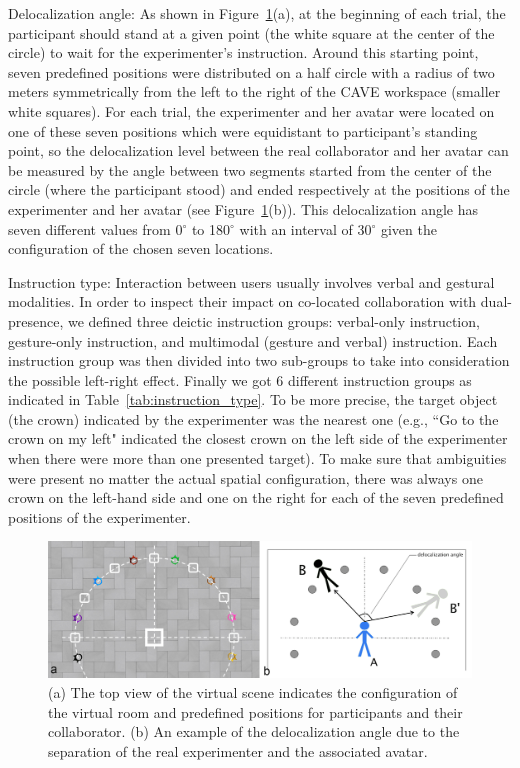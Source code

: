Delocalization angle: As shown in Figure~\ref{fig:2_floor}(a), at the beginning of each trial, the participant should stand at a given point (the white square at the center of the circle) to wait for the experimenter's instruction. Around this starting point, seven predefined positions were distributed on a half circle with a radius of two meters symmetrically from the left to the right of the CAVE workspace (smaller white squares). For each trial, the experimenter and her avatar were located on one of these seven positions which were equidistant to participant's standing point, so the delocalization level between the real collaborator and her avatar can be measured by the angle between two segments started from the center of the circle (where the participant stood) and ended respectively at the positions of the experimenter and her avatar (see Figure~\ref{fig:2_floor}(b)). This delocalization angle has seven different values from 0$^\circ$ to 180$^\circ$ with an interval of 30$^\circ$ given the configuration of the chosen seven locations.

Instruction type: Interaction between users usually involves verbal and gestural modalities. In order to inspect their impact on co-located collaboration with dual-presence, we defined three deictic instruction groups: verbal-only instruction, gesture-only instruction, and multimodal (gesture and verbal) instruction. Each instruction group was then divided into two sub-groups to take into consideration the possible left-right effect. Finally we got 6 different instruction groups as indicated in Table~\ref{tab:instruction_type}. To be more precise, the target object (the crown) indicated by the experimenter was the nearest one (e.g., ``Go to the crown on my left" indicated the closest crown on the left side of the experimenter when there were more than one presented target). To make sure that ambiguities were present no matter the actual spatial configuration, there was always one crown on the left-hand side and one on the right for each of the seven predefined positions of the experimenter.

\begin{figure}[tb]
  \centering
  \includegraphics[width=\textwidth]{figures/ch2/floor}
  \caption{\label{fig:2_floor}(a) The top view of the virtual scene indicates the configuration of the virtual room and predefined positions for participants and their collaborator. (b) An example of the delocalization angle due to the separation of the real experimenter and the associated avatar.}
\end{figure}

